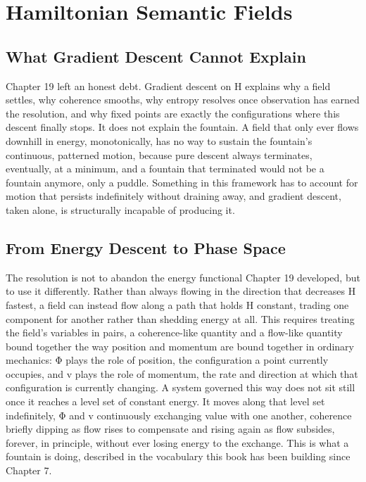 \chapter{Hamiltonian Semantic Fields}

\section{What Gradient Descent Cannot Explain}

Chapter 19 left an honest debt. Gradient descent on H explains why a field settles, why coherence smooths, why entropy resolves once observation has earned the resolution, and why fixed points are exactly the configurations where this descent finally stops. It does not explain the fountain. A field that only ever flows downhill in energy, monotonically, has no way to sustain the fountain's continuous, patterned motion, because pure descent always terminates, eventually, at a minimum, and a fountain that terminated would not be a fountain anymore, only a puddle. Something in this framework has to account for motion that persists indefinitely without draining away, and gradient descent, taken alone, is structurally incapable of producing it.

\section{From Energy Descent to Phase Space}

The resolution is not to abandon the energy functional Chapter 19 developed, but to use it differently. Rather than always flowing in the direction that decreases H fastest, a field can instead flow along a path that holds H constant, trading one component for another rather than shedding energy at all. This requires treating the field's variables in pairs, a coherence-like quantity and a flow-like quantity bound together the way position and momentum are bound together in ordinary mechanics: Φ plays the role of position, the configuration a point currently occupies, and v plays the role of momentum, the rate and direction at which that configuration is currently changing. A system governed this way does not sit still once it reaches a level set of constant energy. It moves along that level set indefinitely, Φ and v continuously exchanging value with one another, coherence briefly dipping as flow rises to compensate and rising again as flow subsides, forever, in principle, without ever losing energy to the exchange. This is what a fountain is doing, described in the vocabulary this book has been building since Chapter 7.

